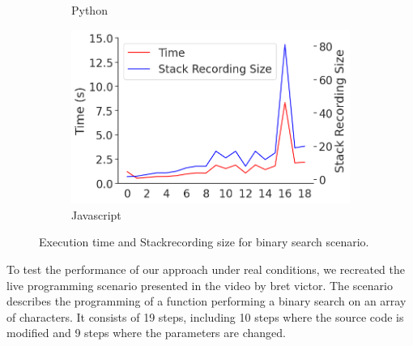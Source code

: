 \documentclass[english,submission]{programming}
\begin{document}
\begin{figure}[htbp]
\begin{subfigure}[b]{0.45\textwidth}
    \caption{\centering Python}
    \label{subfig:scenario-bs-py}
  \end{subfigure}
  \hfill
  \begin{subfigure}[b]{0.45\textwidth}
    \centering
    \includegraphics[width=\textwidth]{img/scenario_bs_javascript.png}
    \caption{\centering Javascript}
    \label{subfig:scenario-bs-js}
  \end{subfigure}

  \caption{Execution time and Stackrecording size for binary search scenario.}
  \label{fig:scenario-bs}
\end{figure}


To test the performance of our approach under real conditions, we recreated the live programming scenario presented in the video by bret victor. 
The scenario describes the programming of a function performing a binary search on an array of characters. It consists of 19 steps, including 10 steps where the source code is modified and 9 steps where the parameters are changed. 
\end{document}
